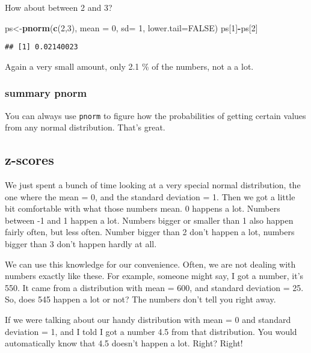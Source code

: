 \documentclass[
]{book}
\newenvironment{Shaded}{\begin{snugshade}}{\end{snugshade}}
\newcommand{\AttributeTok}[1]{\textcolor[rgb]{0.13,0.29,0.53}{#1}}
\newcommand{\ConstantTok}[1]{\textcolor[rgb]{0.56,0.35,0.01}{#1}}
\newcommand{\DecValTok}[1]{\textcolor[rgb]{0.00,0.00,0.81}{#1}}
\newcommand{\FunctionTok}[1]{\textcolor[rgb]{0.13,0.29,0.53}{\textbf{#1}}}
\newcommand{\NormalTok}[1]{#1}
\newcommand{\OtherTok}[1]{\textcolor[rgb]{0.56,0.35,0.01}{#1}}
\newcommand{\SpecialCharTok}[1]{\textcolor[rgb]{0.81,0.36,0.00}{\textbf{#1}}}
\begin{document}
How about between 2 and 3?

\begin{Shaded}
\begin{Highlighting}[]
\NormalTok{ps}\OtherTok{\textless{}{-}}\FunctionTok{pnorm}\NormalTok{(}\FunctionTok{c}\NormalTok{(}\DecValTok{2}\NormalTok{,}\DecValTok{3}\NormalTok{), }\AttributeTok{mean =} \DecValTok{0}\NormalTok{, }\AttributeTok{sd=} \DecValTok{1}\NormalTok{, }\AttributeTok{lower.tail=}\ConstantTok{FALSE}\NormalTok{)}
\NormalTok{ps[}\DecValTok{1}\NormalTok{]}\SpecialCharTok{{-}}\NormalTok{ps[}\DecValTok{2}\NormalTok{]}
\end{Highlighting}
\end{Shaded}

\begin{verbatim}
## [1] 0.02140023
\end{verbatim}

Again a very small amount, only 2.1 \% of the numbers, not a a lot.

\hypertarget{summary-pnorm}{%
\subsubsection{summary pnorm}\label{summary-pnorm}}

You can always use \texttt{pnorm} to figure how the probabilities of getting
certain values from any normal distribution. That's great.

\hypertarget{z-scores}{%
\subsection{z-scores}\label{z-scores}}

We just spent a bunch of time looking at a very special normal
distribution, the one where the mean = 0, and the standard deviation
= 1. Then we got a little bit comfortable with what those numbers mean.
0 happens a lot. Numbers between -1 and 1 happen a lot. Numbers bigger
or smaller than 1 also happen fairly often, but less often. Number
bigger than 2 don't happen a lot, numbers bigger than 3 don't happen
hardly at all.

We can use this knowledge for our convenience. Often, we are not dealing
with numbers exactly like these. For example, someone might say, I got a
number, it's 550. It came from a distribution with mean = 600, and
standard deviation = 25. So, does 545 happen a lot or not? The numbers
don't tell you right away.

If we were talking about our handy distribution with mean = 0 and
standard deviation = 1, and I told I got a number 4.5 from that
distribution. You would automatically know that 4.5 doesn't happen a
lot. Right? Right!
\end{document}
